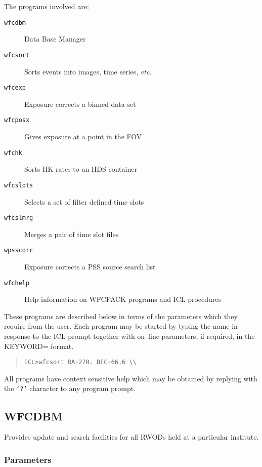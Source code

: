 The programs involved are:

\begin{description}
\begin{description}
\item [{\tt wfcdbm}]   Data Base Manager
\item [{\tt wfcsort}]  Sorts events into images, time series, {\em etc.}
\item [{\tt wfcexp}]   Exposure corrects a binned data set
\item [{\tt wfcposx}]  Gives exposure at a point in the FOV
\item [{\tt wfchk}]    Sorts HK rates to an HDS container
\item [{\tt wfcslots}] Selects a set of filter defined time slots
\item [{\tt wfcslmrg}] Merges a pair of time slot files
\item [{\tt wpsscorr}] Exposure corrects a PSS source search list
\item [{\tt wfchelp}]  Help information on WFCPACK programs and ICL procedures
\end{description}
\end{description}

These programs are described below in terms of the parameters which
they require from the user.  Each program may be started by typing the
name in response to the ICL prompt together with on--line parameters,
if required, in the KEYWORD= format.

\begin{quote}
{\tt ICL\verb+>+wfcsort RA=270. DEC=66.6 \verb+\\+}
\end{quote}

All programs have context sensitive help which may be obtained by
replying with the {\tt `?'} character to any program prompt.

\subsection{WFCDBM}
\label{sec:programs:wfcdbm}

Provides update and search facilities for all RWODs held at a particular
institute.

\subsubsection{Parameters}

